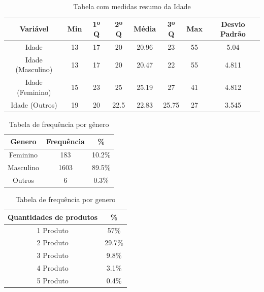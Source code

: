 \documentclass[11pt,a4paper]{article}
\begin{document}
\begin{table}[h!]
  \begin{center}
    \begin{tabular}{c|c|c|c|c|c|c|c}
    \hline
      \textbf{Variável} & \textbf{Min} &  \textbf{1º Q} &\textbf{2º Q} &  \textbf{Média}  & \textbf{3º Q} & \textbf{Max}  & \textbf{Desvio Padrão} \\
      \hline
      Idade & 13 & 17 & 20 & 20.96 & 23 & 55 & 5.04\\
      \hline
      Idade (Masculino) & 13 & 17 & 20 & 20.47 & 22 & 55 & 4.811\\
      \hline 
      Idade (Feminino)& 15 & 23 & 25 & 25.19 & 27 & 41 & 4.812\\
      \hline
      Idade (Outros)& 19 & 20 & 22.5 & 22.83 & 25.75 & 27 & 3.545\\
      \hline
    \end{tabular}
    \caption{Tabela com medidas resumo da Idade}
     \label{table:1}
  \end{center}
\end{table}

\begin{table}[h!]
 \begin{center}
\begin{tabular}{c|c|c}
\hline
Genero & Frequência & \%\\
\hline
Feminino & 183 & 10.2\% \\
\hline
Masculino & 1603 & 89.5\% \\
\hline
Outros & 6 & 0.3\% \\
\hline
\end{tabular}
    \caption{Tabela de frequência por gênero}
     \label{table:2}
  \end{center}
\end{table}

\begin{table}[h!]
 \begin{center}
\begin{tabular}{c|c}
\hline
Quantidades de produtos& \% \\
\hline
1 Produto & 57\% \\
\hline
2 Produto& 29.7\%  \\
\hline
3 Produto & 9.8\% \\
\hline
4 Produto & 3.1\% \\
\hline
5 Produto& 0.4\%  \\
\hline
\end{tabular}
    \caption{Tabela de frequência por genero}
     \label{table:3}
  \end{center}
\end{table}
\end{document}
